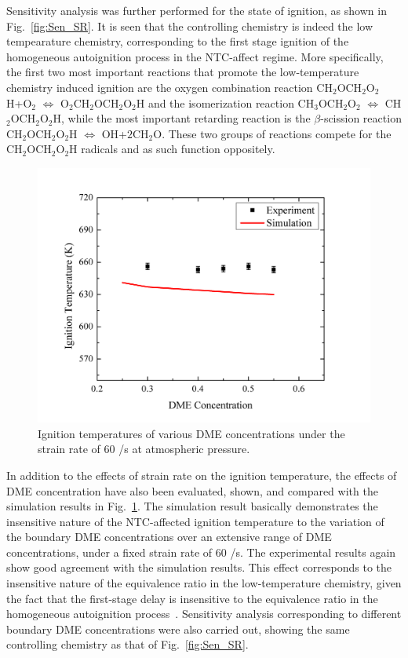 Sensitivity analysis was further performed for the state of ignition, as shown in Fig.~\ref{fig:Sen_SR}.  It is seen that the controlling chemistry is indeed the low tempearature chemistry, corresponding to the first stage ignition of the homogeneous autoignition process in the NTC-affect regime.  More specifically, the first two most important reactions that promote the low-temperature chemistry induced ignition are the oxygen combination reaction CH$_2$OCH$_2$O$_2$H+O$_2$ $\Leftrightarrow$ O$_2$CH$_2$OCH$_2$O$_2$H and the isomerization reaction CH$_3$OCH$_2$O$_2$ $\Leftrightarrow$ CH$_2$OCH$_2$O$_2$H, while the most important retarding reaction is the $\beta$-scission reaction CH$_2$OCH$_2$O$_2$H $\Leftrightarrow$ OH+$2$CH$_2$O.  These two groups of reactions compete for the CH$_2$OCH$_2$O$_2$H radicals and as such function oppositely.

\begin{figure}[t]
  \centering
  \scriptsize
  \includegraphics[width=1.0\textwidth]{ch-NTC/Ign-Con.png}
  \normalsize
  \caption{Ignition temperatures of various DME concentrations under the strain rate of $60$ /s at atmospheric pressure.}
  \label{fig:Ign-Con}
\end{figure}

In addition to the effects of strain rate on the ignition temperature, the effects of DME concentration have also been evaluated, shown, and compared with the simulation results in Fig.~\ref{fig:Ign-Con}.  The simulation result basically demonstrates the insensitive nature of the NTC-affected ignition temperature to the variation of the boundary DME concentrations over an extensive range of DME concentrations, under a fixed strain rate of $60$ /s.  The experimental results again show good agreement with the simulation results.  This effect corresponds to the insensitive nature of the equivalence ratio in the low-temperature chemistry, given the fact that the first-stage delay is insensitive to the equivalence ratio in the homogeneous autoignition process~\cite{zhao13}.  Sensitivity analysis corresponding to different boundary DME concentrations were also carried out, showing the same controlling chemistry as that of Fig.~\ref{fig:Sen_SR}.

